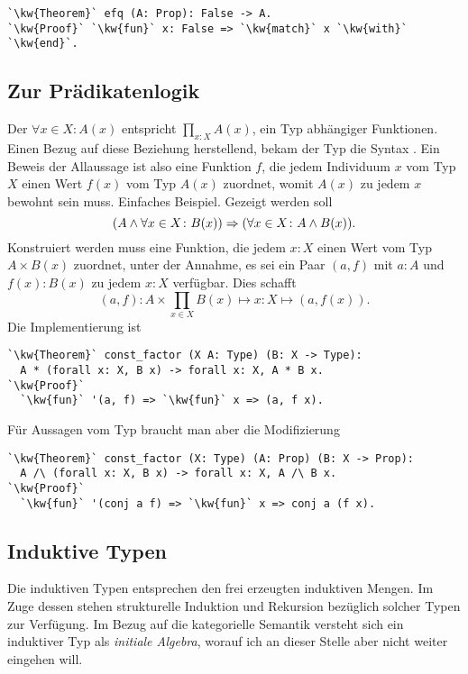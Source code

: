 \begin{lstlisting}[escapechar=`, xleftmargin=\mathindent]
`\kw{Theorem}` efq (A: Prop): False -> A.
`\kw{Proof}` `\kw{fun}` x: False => `\kw{match}` x `\kw{with}` `\kw{end}`.
\end{lstlisting}

\subsection{Zur Prädikatenlogik}

Der  $\forall x\in X\colon A(x)$ entspricht
$\prod_{x\colon X} A(x)$, ein Typ abhängiger Funktionen. Einen Bezug auf
diese Beziehung herstellend, bekam der Typ die Syntax
. Ein Beweis der Allaussage ist also eine
Funktion $f$, die jedem Individuum $x$ vom Typ $X$ einen Wert $f(x)$ vom
Typ $A(x)$ zuordnet, womit $A(x)$ zu jedem $x$ bewohnt sein muss.
Einfaches Beispiel. Gezeigt werden soll
\[(A\land\forall x\in X\colon B(x))\Rightarrow (\forall x\in X\colon A\land B(x)).\]
Konstruiert werden muss eine Funktion, die jedem $x\colon X$ einen
Wert vom Typ $A\times B(x)$ zuordnet, unter der Annahme, es sei ein Paar $(a,f)$
mit $a\colon A$ und $f(x)\colon B(x)$ zu jedem $x\colon X$ verfügbar.
Dies schafft
\[\textstyle (a,f)\colon A\times\prod_{x\in X} B(x)\mapsto
x\colon X\mapsto (a, f(x)).\]
Die Implementierung ist
\begin{lstlisting}[escapechar=`, xleftmargin=\mathindent]
`\kw{Theorem}` const_factor (X A: Type) (B: X -> Type):
  A * (forall x: X, B x) -> forall x: X, A * B x.
`\kw{Proof}`
  `\kw{fun}` '(a, f) => `\kw{fun}` x => (a, f x).
\end{lstlisting}
Für Aussagen vom Typ  braucht man aber die Modifizierung
\begin{lstlisting}[escapechar=`, xleftmargin=\mathindent]
`\kw{Theorem}` const_factor (X: Type) (A: Prop) (B: X -> Prop):
  A /\ (forall x: X, B x) -> forall x: X, A /\ B x.
`\kw{Proof}`
  `\kw{fun}` '(conj a f) => `\kw{fun}` x => conj a (f x).
\end{lstlisting}

\subsection{Induktive Typen}

Die induktiven Typen entsprechen den frei erzeugten induktiven Mengen.
Im Zuge dessen stehen strukturelle Induktion und Rekursion bezüglich
solcher Typen zur Verfügung. Im Bezug auf die kategorielle Semantik
versteht sich ein induktiver Typ als \emph{initiale Algebra}, worauf ich
an dieser Stelle aber nicht weiter eingehen will.

